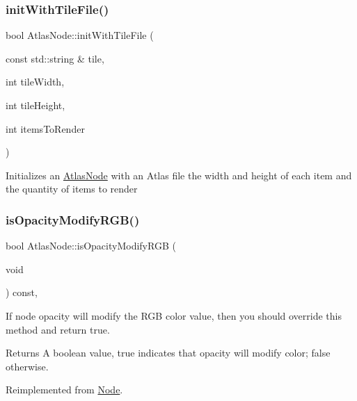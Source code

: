 \subsubsection{\texorpdfstring{init\+With\+Tile\+File()}{initWithTileFile()}\hspace{0.1cm}{\footnotesize\ttfamily [2/2]}}
{\footnotesize\ttfamily bool Atlas\+Node\+::init\+With\+Tile\+File (\begin{DoxyParamCaption}\item[{const std\+::string \&}]{tile,  }\item[{int}]{tile\+Width,  }\item[{int}]{tile\+Height,  }\item[{int}]{items\+To\+Render }\end{DoxyParamCaption})}

Initializes an \hyperlink{classAtlasNode}{Atlas\+Node} with an Atlas file the width and height of each item and the quantity of items to render \mbox{\label{classAtlasNode_a3aa161e8abaff7422b7f9ef895f9439d}} 
\subsubsection{\texorpdfstring{is\+Opacity\+Modify\+R\+G\+B()}{isOpacityModifyRGB()}\hspace{0.1cm}{\footnotesize\ttfamily [1/2]}}
{\footnotesize\ttfamily bool Atlas\+Node\+::is\+Opacity\+Modify\+R\+GB (\begin{DoxyParamCaption}\item[{void}]{ }\end{DoxyParamCaption}) const\hspace{0.3cm}{\ttfamily [override]}, {\ttfamily [virtual]}}

If node opacity will modify the R\+GB color value, then you should override this method and return true. \begin{DoxyReturn}{Returns}
A boolean value, true indicates that opacity will modify color; false otherwise. 
\end{DoxyReturn}


Reimplemented from \hyperlink{classNode_ae6ce32d2088e2bb3426608334f1091c5}{Node}.

\mbox{\label{classAtlasNode_ad7d0c0a791719739d15e4f07c75f6704}} 
